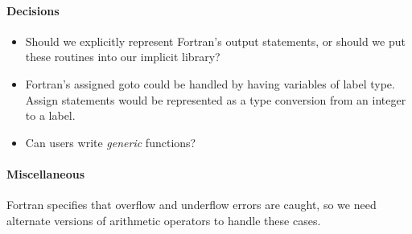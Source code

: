 \documentclass[11pt]{article}
\begin{document}
\paragraph{Decisions}
\begin{itemize}
\item Should we explicitly represent Fortran's output statements, or
should we put these routines into our implicit library?
\item Fortran's assigned goto could be handled by having variables of
label type.  Assign statements would be represented as a type
conversion from an integer to a label.
\item Can users write \emph{generic} functions?
\end{itemize}


\paragraph{Miscellaneous}
Fortran specifies that overflow and underflow errors are caught, so we
need alternate versions of arithmetic operators to handle these cases.
\end{document}
